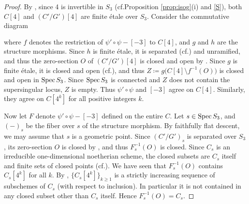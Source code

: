 \documentclass{gtpart}
\theoremstyle{definition}
\theoremstyle{remark}
\newcommand{\Spec}{{\rm Spec\thinspace}}
\newcommand{\cf}{cf.\thinspace}
\newcommand{\isog}[1]{Proposition \ref{prop:isog}\thinspace (#1)}
\begin{document}
\begin{proof}
 By \cite[Theorem 2.3.1]{KM}, since 4 is invertible in $S_3$ (\cf \isog{i} and \eqref{S}), 
 both $C[4]$ and $(C'/G')[4]$ are finite \'etale over $S_3$.  
 Consider the commutative diagram 
 \begin{center}
 \end{center}
 where $f$ denotes the restriction of $\psi' \circ \psi - [-3]$ to $C[4]$, and $g$ and $h$ are the structure morphisms.  
 Since $h$ is finite \'etale, it is separated (\cf \cite[Appendix D]{GW}) and unramified, 
 and thus the zero-section $O$ of $(C'/G')[4]$ is closed and open 
 by \cite[Proposition \href{http://math.columbia.edu/algebraic_geometry/stacks-git/locate.php?tag=024T}{024T}]{stacks-project}.  
 Since $g$ is finite \'etale, it is closed and open (\cf \cite[Appendix D]{GW}), 
 and thus $Z \coloneqq g \big( C[4] \setminus f^{-1}(O) \big)$ is closed and open in $\Spec S_3$.  
 Since $\Spec S_3$ is connected and $Z$ does not contain the supersingular locus, $Z$ is empty.  
 Thus $\psi' \circ \psi$ and $[-3]$ agree on $C[4]$.  
 Similarly, they agree on $C[4^k]$ for all positive integers $k$.  

 Now let $F$ denote $\psi' \circ \psi - [-3]$ defined on the entire $C$.  
 Let $s \in \Spec S_3$, and $(-)_s$ be the fiber over $s$ of the structure morphism.  
 By faithfully flat descent, we may assume that $s$ is a geometric point.  
 Since $(C'/G')_s$ is separated over $S_3$, 
 its zero-section $O$ is closed by \cite[Proposition \href{http://math.columbia.edu/algebraic_geometry/stacks-git/locate.php?tag=024T}{024T}]{stacks-project}, 
 and thus $F_s^{-1}(O)$ is closed.  
 Since $C_s$ is an irreducible one-dimensional noetherian scheme, 
 the closed subsets are $C_s$ itself and finite sets of closed points (\cf \cite[Corollary 15.3]{GW}).  
 We have seen that $F_s^{-1}(O)$ contains $C_s[4^k]$ for all $k$.  
 By \cite[Theorem 2.3.1]{KM}, $\{ C_s[4^k] \}_{k \geq 1}$ is a strictly increasing sequence of subschemes of $C_s$ (with respect to inclusion).  
 In particular it is not contained in any closed subset other than $C_s$ itself.  
 Hence $F_s^{-1}(O) = C_s$.  
\end{proof}
\end{document}
